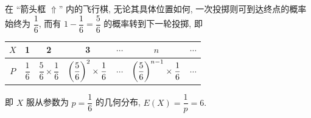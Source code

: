 \begin{example}
\begin{minipage}[t]{0.28\linewidth}
\begin{figure}[H]
        \end{figure}
    \end{minipage}
\end{example}
\begin{solution}
    在 “箭头框 $\Uparrow $” 内的飞行棋, 无论其具体位置如何, 一次投掷则可到达终点的概率始终为 $\dfrac{1}{6}$, 而有 $1-\dfrac{1}{6}=\dfrac{5}{6}$ 的概率转到下一轮投掷, 即 
    \begin{table}[H]
        \centering
        \begin{tabular}{c|cccccc}
            $X$ & 1 & 2 & 3 & $\cdots$ & $n$ & $\cdots$\\ 
            \hline
            $P$ & $\dfrac{1}{6}$ & $\dfrac{5}{6}\times\dfrac{1}{6}$ & $\qty(\dfrac{5}{6})^2\times\dfrac{1}{6}$ & $\cdots$ & $\qty(\dfrac{5}{6})^{n-1}\times\dfrac{1}{6}$ & $\cdots$ 
        \end{tabular}
    \end{table}
    即 $X$ 服从参数为 $p=\dfrac{1}{6}$ 的几何分布, $E(X)=\dfrac{1}{p}=6.$
\end{solution}